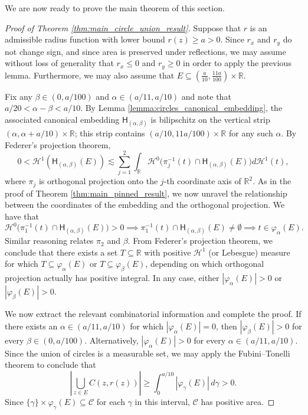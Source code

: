 \documentclass[12pt]{amsart}
\theoremstyle{definition}
\numberwithin{equation}{section}
\begin{document}
We are now ready to prove the main theorem of this section.
\begin{proof}[Proof of Theorem \ref{thm:main_circle_union_result}] Suppose that $r$ is an admissible radius function with lower bound $r(z) \ge a > 0$. Since $r_x$ and $r_y$ do not change sign, and since area is preserved under reflections, we may assume without loss of generality that $r_x \le 0$ and $r_y \ge 0$ in order to apply the previous lemma. Furthermore, we may also assume that $E \subseteq (\frac a {10}, \frac{11a}{100}) \times \mathbb{R}$. 

Fix any $\beta \in (0, a/100)$ and $\alpha \in (a/11, a/10)$ and note that $a/20 < \alpha - \beta < a/10$. By Lemma \ref{lemma:circles_canonical_embedding}, the associated canonical embedding $\mathsf{H}_{(\alpha, \beta)}$ is bilipschitz on the vertical strip $(\alpha, \alpha + a/10) \times \mathbb{R}$; this strip contains $(a/10, 11a/100) \times \mathbb{R}$ for any such $\alpha$. By Federer's projection theorem,
$$0 < \mathcal{H}^1(\mathsf{H}_{(\alpha, \beta)}(E)) \lesssim \sum_{j = 1}^2 \int_{\mathbb{R}} \mathcal{H}^0\big(\pi_j^{-1}(t) \cap \mathsf{H}_{(\alpha, \beta)}(E)\big) d\mathcal{H}^1(t),$$
where $\pi_j$ is orthogonal projection onto the $j$-th coordinate axis of $\mathbb{R}^2$. As in the proof of Theorem \ref{thm:main_pinned_result}, we now unravel the relationship between the coordinates of the embedding and the orthogonal projection. We have that
$$
    \mathcal{H}^0\big(\pi_1^{-1}(t) \cap \mathsf{H}_{(\alpha, \beta)}(E)\big) > 0 \implies \pi_1^{-1}(t) \cap \mathsf{H}_{(\alpha, \beta)}(E) \ne \emptyset
    \implies t \in \varphi_{\alpha}(E).
$$
Similar reasoning relates $\pi_2$ and $\beta$. From Federer's projection theorem, we conclude that there exists a set $T \subseteq\mathbb{R}$ with positive $\mathcal{H}^1$ (or Lebesgue) measure for which $T \subseteq \varphi_{\alpha}(E)$ or $T \subseteq \varphi_{\beta}(E)$, depending on which orthogonal projection actually has positive integral. In any case, either $|\varphi_{\alpha}(E)| > 0$ or $|\varphi_{\beta}(E)| > 0$. 

We now extract the relevant combinatorial information and complete the proof. If there exists an $\alpha \in (a/11, a/10)$ for which $|\varphi_{\alpha}(E)| = 0$, then $|\varphi_{\beta}(E)| > 0$ for every $\beta \in (0, a/100)$. Alternatively, $|\varphi_{\alpha}(E)| > 0$ for every $\alpha \in (a/11, a/10)$. Since the union of circles is a measurable set, we may apply the Fubini--Tonelli theorem to conclude that 
$$\left|\bigcup_{z\in E} C(z,r(z))\right| \geq \int_0^{a/10} |\varphi_{\gamma}(E)| \, d\gamma > 0.$$
Since $\{\gamma\} \times \varphi_{\gamma}(E) \subseteq \mathcal{C}$ for each $\gamma$ in this interval, $\mathcal{C}$ has positive area.
\end{proof}
\end{document}
